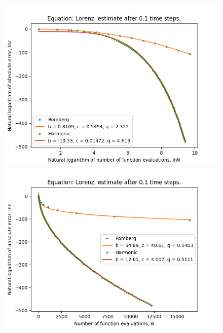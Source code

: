 \begin{figure}[H]
\centering
\begin{minipage}{0.45\textwidth}
\centering
\includegraphics[scale=0.45]{emr_plots/lorenz_hp_log_log_pow_fit_trend.png}
\end{minipage}
\begin{minipage}{0.45\textwidth}
\centering
\includegraphics[scale=0.45]{emr_plots/lorenz_hp_trend.png}
\end{minipage}
\end{figure}

